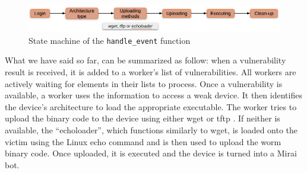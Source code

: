 \begin{figure}[ht]
    \centering
    \includegraphics[scale=0.5]{resources/images/state-machine.png}
    \caption{State machine of the \texttt{handle\_event} function}
    \label{fig:state-machine}
\end{figure}

What we have said so far, can be summarized as follow: when a vulnerability result is received, it is added to a worker's list of vulnerabilities. All workers are actively waiting for elements in their lists to process. Once a vulnerability is available, a worker uses the information to access a weak device. It then identifies the device's architecture to load the appropriate executable. The worker tries to upload the binary code to the device using either wget or tftp . If neither is available, the ``echoloader'', which functions similarly to wget, is loaded onto the victim using the Linux echo command and is then used to upload the worm binary code. Once uploaded, it is executed and the device is turned into a Mirai bot.\cite{de2018ddos}